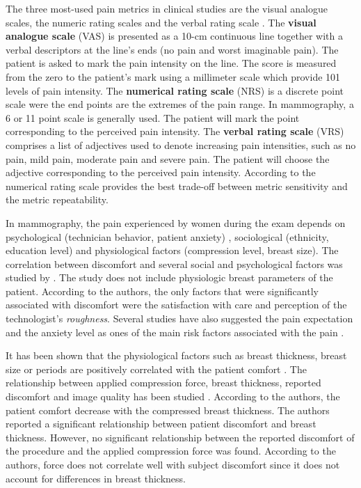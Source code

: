 The three most-used pain metrics in clinical studies are the visual analogue scales, the numeric rating scales and the verbal rating scale \citep{williamson_pain_2005}. The \textbf{visual analogue scale} (VAS) is presented as a 10-cm continuous line together with a verbal descriptors at the line's ends (no pain and worst imaginable pain). The patient is asked to mark the pain intensity on the line. The score is measured from the zero to the patient's mark using a millimeter scale which provide 101 levels of pain intensity. The \textbf{numerical rating scale} (NRS) is a discrete point scale were the end points are the extremes of the pain range. In mammography, a 6 or 11 point scale is generally used.  The patient will mark the point corresponding to the perceived pain intensity. The \textbf{verbal rating scale} (VRS) comprises a list of adjectives used to denote increasing pain intensities, such as no pain, mild pain, moderate pain and severe pain. The patient will choose the adjective corresponding to the perceived pain intensity. According to \citep{williamson_pain_2005} the numerical rating scale provides the best trade-off between metric sensitivity and the metric repeatability.     

In mammography, the pain experienced by women during the exam depends on psychological (technician behavior, patient anxiety) \citep{aro_pain_1996}, sociological  (ethnicity, education level) \citep{dullum_rates_2000} and physiological factors (compression level, breast size)\citep{poulos_breast_2003}.  The correlation between discomfort and several social and psychological factors was studied by \cite{dullum_rates_2000}.  The study does not include physiologic breast parameters of the patient. According to the authors, the only factors that were significantly associated with discomfort were the satisfaction with care and perception of the technologist's \textit{roughness}. Several studies have also suggested the pain expectation and the anxiety level as ones of the main risk factors associated with the pain \citep{aro_pain_1996,williamson_pain_2005,keemers_pain_2000,askhar_female_2017}.   

It has been shown that the physiological factors such as breast thickness, breast size or periods are positively correlated with the patient comfort \citep{keemers_pain_2000,hafslund_mammography_2000}. The relationship between applied compression force, breast thickness, reported discomfort and image quality has been studied \citep{poulos_breast_2003}. According to the authors, the patient comfort decrease with the compressed breast thickness. The authors reported a significant relationship between patient discomfort and breast thickness. However, no significant relationship between the reported discomfort of the procedure and the applied compression force was found. According to the authors, force does not correlate well with subject discomfort since it does not account for differences in breast thickness.
 
